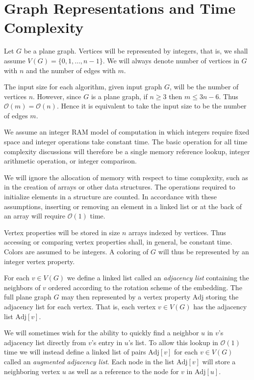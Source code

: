 \documentclass[letterpaper, 12pt]{article}
\theoremstyle{definition}
\theoremstyle{definition}
\theoremstyle{thm}
\theoremstyle{definition}
\begin{document}
\section{Graph Representations and Time Complexity}
Let $G$ be a plane graph. Vertices will be represented by integers, that is, we
shall assume $V(G)=\{0,1,\ldots,n-1\}$. We will always denote
number of vertices in $G$ with $n$ and the number of edges with $m$.

The input size for each algorithm, given input graph $G$, will be the
number of vertices $n$. However, since $G$ is a plane graph, if $n\ge 3$ then
$m\le 3n-6$. Thus $\mathcal{O}(m)= \mathcal{O}(n)$. Hence it is equivalent to
take the input size to be the number of edges $m$.

We assume an integer RAM model of computation in which integers require
fixed space and integer operations take constant time. The basic operation
for all time complexity discussions will therefore be a single memory reference
lookup, integer arithmetic operation, or integer comparison.

We will ignore the allocation of memory with respect to time complexity, such
as in the creation of arrays or other data structures. The operations
required to initialize elements in a structure are counted. In accordance
with these assumptions, inserting or removing an element in a linked list or at
the back of an array will require $\mathcal{O}(1)$ time.

Vertex properties will be stored in size $n$ arrays indexed by vertices. Thus accessing
or comparing vertex properties shall, in general, be constant time. Colors are assumed to be integers. A coloring of $G$ will thus be represented by
an integer vertex property.

For each $v\in V(G)$ we define a linked list called an
\emph{adjacency list} containing the neighbors of $v$ ordered according to
the rotation scheme of the embedding. The full plane graph $G$ may then
represented by a vertex property $\text{Adj}$ storing the adjacency list for
each vertex. That is, each vertex $v\in V(G)$ has the adjacency list $\text{Adj}[v]$.

We will sometimes wish for the ability to quickly find a neighbor $u$
in $v$'s adjacency list directly from $v$'s entry in $u$'s list. To allow this lookup in
$\mathcal{O}(1)$ time we will instead define a linked list of pairs $\text{Adj}[v]$ for
each $v\in V(G)$ called an \textit{augmented adjacency list}. Each node in the
list $\text{Adj}[v]$ will store a neighboring vertex $u$ as well as a reference
to the node for $v$ in $\text{Adj}[u]$.
\end{document}
